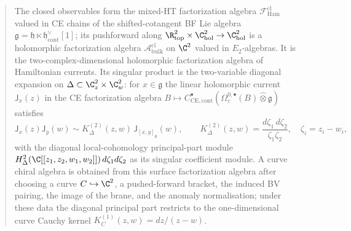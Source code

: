 \begin{abstract}
\medskip\noindent
The closed observables form the mixed-HT factorization algebra
$\mathcal F^{\mathrm{cl}}_{\mathrm{Ham}}$ valued in CE chains of
the shifted-cotangent BF Lie algebra
$\mathfrak g=\mathfrak h\ltimes\mathfrak h^\vee_{\mathrm{cont}}[1]$;
its pushforward along $\R^2_{\mathrm{top}}\times\C^2_{\mathrm{hol}}
\to\C^2_{\mathrm{hol}}$ is a holomorphic factorization algebra
$\mathcal A^{\mathrm{cl}}_{\mathrm{bulk}}$ on $\C^2$ valued in
$E_2$-algebras.  It is the two-complex-dimensional holomorphic
factorization algebra of Hamiltonian currents.  Its singular product
is the two-variable diagonal expansion on
$\Delta\subset\C^2_z\times\C^2_w$: for $x\in\mathfrak g$ the
linear holomorphic current $\mathsf J_x(z)$ in the CE
factorization algebra
$B\mapsto C^\bullet_{\mathrm{CE},\mathrm{cont}}
(\Omega^{0,\bullet}_c(B)\widehat\otimes\mathfrak g)$ satisfies
\[
  \mathsf J_x(z)\mathsf J_y(w)
  \sim K^{(2)}_\Delta(z,w)\,\mathsf J_{[x,y]_{\mathfrak g}}(w),
  \qquad
  K^{(2)}_\Delta(z,w)
   =\frac{d\zeta_1\,d\zeta_2}{\zeta_1\zeta_2},
  \quad \zeta_i=z_i-w_i,
\]
with the diagonal local-cohomology principal-part module
$H^2_\Delta(\C[[z_1,z_2,w_1,w_2]])\,d\zeta_1d\zeta_2$ as its
singular coefficient module.  A curve chiral algebra is obtained from
this surface factorization algebra after choosing a curve
$C\hookrightarrow\C^2$, a pushed-forward bracket, the induced BV
pairing, the image of the brane, and the anomaly normalisation; under
these data the diagonal principal part restricts to the one-dimensional
curve Cauchy kernel
$K^{(1)}_C(z,w)=dz/(z-w)$.


\end{abstract}
